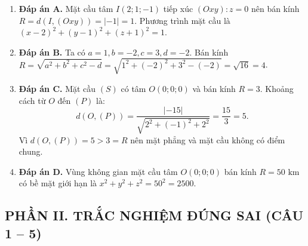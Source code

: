 \documentclass[12pt,a4paper]{article}
\begin{document}
\begin{enumerate}
\item \textbf{Đáp án A.}  
Mặt cầu tâm $I(2; 1; -1)$ tiếp xúc $(Oxy): z = 0$ nên bán kính $R = d(I, (Oxy)) = |-1| = 1$.  
Phương trình mặt cầu là $(x-2)^2 + (y-1)^2 + (z+1)^2 = 1$.

\item \textbf{Đáp án B.}  
Ta có $a = 1, b = -2, c = 3, d = -2$.  
Bán kính $R = \sqrt{a^2 + b^2 + c^2 - d} = \sqrt{1^2 + (-2)^2 + 3^2 - (-2)} = \sqrt{16} = 4$.

\item \textbf{Đáp án C.}  
Mặt cầu $(S)$ có tâm $O(0; 0; 0)$ và bán kính $R = 3$.  
Khoảng cách từ $O$ đến $(P)$ là:
\[
d(O, (P)) = \dfrac{|-15|}{\sqrt{2^2 + (-1)^2 + 2^2}} = \dfrac{15}{3} = 5.
\]
Vì $d(O, (P)) = 5 > 3 = R$ nên mặt phẳng và mặt cầu không có điểm chung.

\item \textbf{Đáp án D.}  
Vùng không gian mặt cầu tâm $O(0; 0; 0)$ bán kính $R = 50\text{ km}$ có bề mặt giới hạn là $x^2 + y^2 + z^2 = 50^2 = 2500$.
\end{enumerate}

\subsection*{PHẦN II. TRẮC NGHIỆM ĐÚNG SAI (CÂU 1 -- 5)}
\end{document}
